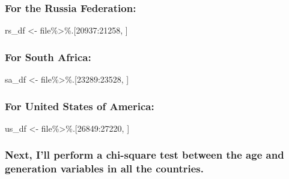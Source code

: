 \documentclass[
]{article}
\newenvironment{Shaded}{\begin{snugshade}}{\end{snugshade}}
\newcommand{\DecValTok}[1]{\textcolor[rgb]{0.00,0.00,0.81}{#1}}
\newcommand{\NormalTok}[1]{#1}
\newcommand{\OtherTok}[1]{\textcolor[rgb]{0.56,0.35,0.01}{#1}}
\newcommand{\SpecialCharTok}[1]{\textcolor[rgb]{0.00,0.00,0.00}{#1}}
\begin{document}
\hypertarget{for-the-russia-federation}{%
\subsubsection{For the Russia
Federation:}\label{for-the-russia-federation}}

\begin{Shaded}
\begin{Highlighting}[]
\NormalTok{rs\_df }\OtherTok{\textless{}{-}}\NormalTok{ file}\SpecialCharTok{\%\textgreater{}\%}\NormalTok{.[}\DecValTok{20937}\SpecialCharTok{:}\DecValTok{21258}\NormalTok{, ]}
\end{Highlighting}
\end{Shaded}

\hypertarget{for-south-africa}{%
\subsubsection{For South Africa:}\label{for-south-africa}}

\begin{Shaded}
\begin{Highlighting}[]
\NormalTok{sa\_df }\OtherTok{\textless{}{-}}\NormalTok{ file}\SpecialCharTok{\%\textgreater{}\%}\NormalTok{.[}\DecValTok{23289}\SpecialCharTok{:}\DecValTok{23528}\NormalTok{, ]}
\end{Highlighting}
\end{Shaded}

\hypertarget{for-united-states-of-america}{%
\subsubsection{For United States of
America:}\label{for-united-states-of-america}}

\begin{Shaded}
\begin{Highlighting}[]
\NormalTok{us\_df }\OtherTok{\textless{}{-}}\NormalTok{ file}\SpecialCharTok{\%\textgreater{}\%}\NormalTok{.[}\DecValTok{26849}\SpecialCharTok{:}\DecValTok{27220}\NormalTok{, ]}
\end{Highlighting}
\end{Shaded}

\hypertarget{next-ill-perform-a-chi-square-test-between-the-age-and-generation-variables-in-all-the-countries.}{%
\subsubsection{Next, I'll perform a chi-square test between the age and
generation variables in all the
countries.}\label{next-ill-perform-a-chi-square-test-between-the-age-and-generation-variables-in-all-the-countries.}}
\end{document}

